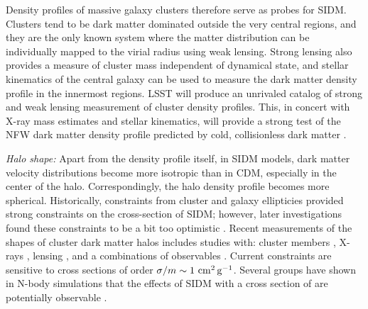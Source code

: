 Density profiles of massive galaxy clusters therefore serve as probes for SIDM. Clusters tend to be dark matter dominated outside the very central regions, and they are the only known system where the matter distribution can be individually mapped to the virial radius using weak lensing. Strong lensing also provides a measure of cluster mass independent of dynamical state, and stellar kinematics of the central galaxy can be used to measure the dark matter density profile in the innermost regions. LSST will produce an unrivaled catalog of strong and weak lensing measurement of cluster density profiles. This, in concert with X-ray mass estimates and stellar kinematics, will provide a strong test of the NFW dark matter density profile predicted by cold, collisionless dark matter \citep{Newman:2013,Kaplinghat:2015aga,Robertson:2018anx,Andrade:2019wzn}. 

\emph{Halo shape: }Apart from the density profile itself, in SIDM models, dark matter velocity distributions become more isotropic than in CDM, especially in the center of the halo.  Correspondingly,  the halo density profile becomes more spherical.  Historically, constraints from cluster and galaxy ellipticies \citep{Miralde-Escuda:2000} provided strong constraints on the cross-section of SIDM; however, later investigations found these constraints to be a bit too optimistic \citep{Peter:2013}. 
Recent measurements of the shapes of cluster dark matter halos includes studies with: cluster members \citep{2018MNRAS.475.2421S},  X-rays \citep{Hashimoto:2007},  lensing \citep{Mandelbaum:2006, Evans:2009, Oguri:2010}, and a combinations of observables \citep{Clampitt:2016, Sereno:2018}.  
Current constraints are sensitive to cross sections of order $\sigma / m \sim 1 \mathrm{\,\mathrm{\,cm}^2\mathrm{\,g}^{-1}}$.
Several groups have shown in N-body simulations that the effects of SIDM with a cross section of  are potentially observable \citep[\eg][]{Peter:2013, Robertson:2018, Brinckmann:2018}.





